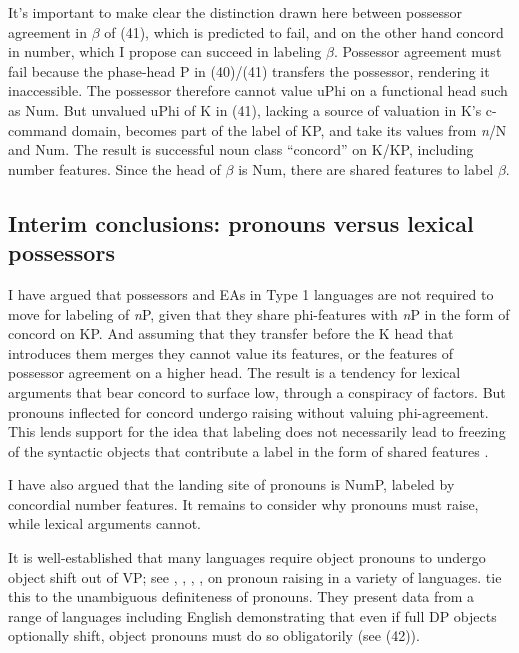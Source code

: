 \documentclass[output=paper
,modfonts
,nonflat]{langsci/langscibook}
\begin{document}
It’s important to make clear the distinction drawn here between possessor agreement in $\beta$ of (41), which is predicted to fail, and on the other hand concord in number, which I propose can succeed in labeling $\beta$. Possessor agreement must fail because the phase-head P in (40)/(41) transfers the possessor, rendering it inaccessible. The possessor therefore cannot value uPhi on a functional head such as Num. But unvalued uPhi of K in (41), lacking a source of valuation in K’s c-command domain, becomes part of the label of KP, and take its values from \textit{n}/N and Num. The result is successful noun class “concord” on K/KP, including number features. Since the head of $\beta$ is Num, there are shared features to label $\beta$.  

\subsection{Interim conclusions: pronouns versus lexical possessors}
I have argued that possessors and EAs in Type 1 languages are not required to move for labeling of \textit{n}P, given that they share phi-features with \textit{n}P in the form of concord on KP. And assuming that they transfer before the K head that introduces them merges they cannot value its features, or the features of possessor agreement on a higher head. The result is a tendency for lexical arguments that bear concord to surface low, through a conspiracy of factors. But pronouns inflected for concord undergo raising without valuing phi-agreement. This lends support for the idea that labeling does not necessarily lead to freezing of the syntactic objects that contribute a label in the form of shared features \citep{Chomsky2015}. 

I have also argued that the landing site of pronouns is NumP, labeled by concordial number features. It remains to consider why pronouns must raise, while lexical arguments cannot. 

It is well-established that many languages require object pronouns to undergo object shift out of VP; see \citet{Diesing1992, Diesing1997}, \citet{Diesing_Jelinek1995}, \citet{Roberts_Shlonsky1996}, \citet{Cardinaletti_Starke1999}, \citet{Holmberg1999} on pronoun raising in a variety of languages.  \citet{Diesing_Jelinek1995} tie this to the unambiguous definiteness of pronouns. They present data from a range of languages including English demonstrating that even if full DP objects optionally shift, object pronouns must do so obligatorily (see (42)). 
\end{document}
